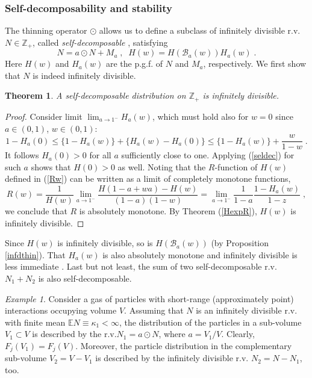 \documentclass[a4paper,12pt]{amsart}
\newcommand{\E}{\mathbb{E}}
\newcommand{\Z}{\mathbb{Z}_{+}}
\newtheorem{Theorem}{Theorem}[section]
\theoremstyle{definition}
\theoremstyle{remark}
\newtheorem{Example}{Example}[section]
\begin{document}
\subsubsection{Self-decomposability and stability}
The thinning operator $\odot$ allows us to define a subclass of infinitely divisible r.v. $N\in \Z $, called {\it self-decomposable} , satisfying \cite{StvH2004}
\begin{equation}\label{seldec}
  N= a \odot N + M_{a}\;,\;\;  H(w)= H(\mathcal{B}_{a}(w))H_a(w)\;. 
\end{equation} 
Here $H(w)$ and $H_a(w)$ are the p.g.f. of $N$ and $M_a$, respectively. We first show that $N$ is indeed infinitely divisible.
\begin{Theorem}{\rm \cite{StvH2004}}\label{sdinfd}
A self-decomposable distribution on $\Z$ is infinitely divisible.
\end{Theorem}
\begin{proof}
Consider limit $\lim_{a\to 1^{-}}H_a(w)$, which must hold also for $w=0$ since $a \in (0,1)$, $w \in (0,1)$:
\[
1-H_a(0) \leq \{1-H_a(w) \} + \{H_a(w)-H_a(0) \} \leq
\{1-H_a(w) \} + \frac{w}{1-w}\;.
\]
It follows $H_a(0) >0$ for all $a$ sufficiently close to one. Applying (\ref{seldec}) for such $a$ shows that  $H(0) >0$ as well. Noting that the $R$-function of  $H(w)$ defined in (\ref{Rw}) can be written as a limit of completely monotone functions,
\[
R(w)=\frac{1}{H(w)}\lim_{a \to 1^{-}}\frac{H(1\!-\!a\!+\!wa)-H(w)}{(1-a)(1-w)}=\lim_{a \to 1^{-}}\frac{1}{1-a}\frac{1-H_a(w)}{1-z}\;,
\]
we conclude that $R$ is absolutely monotone. By Theorem (\ref{HexpR}), $H(w)$ is infinitely divisible.
\end{proof}

Since $H(w)$ is infinitely divisible, so is $H(\mathcal{B}_{a}(w))$ (by Proposition \ref{infdthin}). That $H_a(w)$ is also absolutely monotone and infinitely divisible is less immediate \cite{StvH2004}. Last but not least, the sum of two self-decomposable r.v. $N_1+N_2$ is also self-decomposable.

\begin{Example} Consider a gas of particles with short-range (approximately point) interactions occupying volume $V$. Assuming that $N$ is an infinitely divisible r.v. with finite mean $\E N \equiv \kappa_1<\infty$, the distribution of the particles in a sub-volume $V_1 \subset V$ is described by the r.v.$N_1=a\odot N$,  where $a=V_1/V$.  Clearly, $F_j(V_1)=F_j(V)$. Moreover, the particle distribution in the complementary sub-volume $V_2=V-V_1$ is described by the infinitely divisible r.v. $N_2=N-N_1$, too. 
\end{Example}
\end{document}
